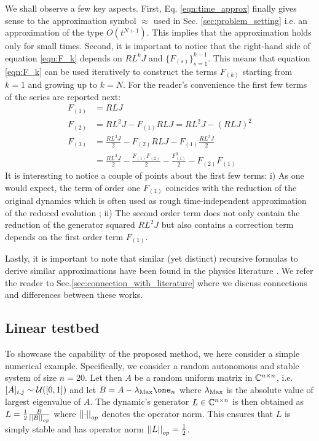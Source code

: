 \documentclass[10pt,aps,pra,twocolumn,showpacs,superscriptaddress,nobalancelastpage,notitlepage,nofootinbib,longbibliography]{revtex4-2}
\begin{document}
We shall observe a few key aspects. 
First, Eq. \eqref{eqn:time_approx} finally gives sense to the approximation symbol $\approx$ used in Sec. \ref{sec:problem_setting} i.e. an approximation of the type $O(t^{N+1})$. This implies that the approximation holds only for small times. 
Second, it is important to notice that the right-hand side of equation \eqref{eqn:F_k} depends on $RL^{k}J$ and $\{F_{(s)}\}_{s=1}^{k-1}$. This means that equation \eqref{eqn:F_k} can be used iteratively to construct the terms $F_{(k)}$ starting from $k=1$ and growing up to $k=N$. 
For the reader's convenience the first few terms of the series are reported next:
\begin{align*}
    F_{(1)} &= RLJ\\
    F_{(2)} &= RL^2J - F_{(1)}RLJ = RL^2J - (RLJ)^2\\
    F_{(3)} &= \frac{RL^3J}{2} - F_{(2)}RLJ - F_{(1)}\frac{RL^2J}{2} \\
    &= \frac{RL^3J}{2} - \frac{F_{(1)}F_{(2)}}{2} - \frac{F_{(1)}^3}{2} - F_{(2)}F_{(1)}
\end{align*}
It is interesting to notice a couple of points about the first few terms: i) As one would expect, the term of order one $F_{(1)}$ coincides with the reduction of the original dynamics which is often used as rough time-independent approximation of the reduced evolution \cite{antoulas}; ii) The second order term does not only contain the reduction of the generator squared $RL^2J$ but also contains a correction term depends on the first order term $F_{(1)}$.  


Lastly, it is important to note that similar (yet distinct) recursive formulas to derive similar approximations have been found in the physics literature \cite{nestmann2019time,cerrillo2014non,cygorek2025timenonlocalversustimelocallongtime,gasbarri2018recursive}.  We refer the reader to Sec.\ref{sec:connection_with_literature} where we discuss connections and differences between these works.

\subsection{Linear testbed}
\label{sec:linear_testbed}

To showcase the capability of the proposed method, we here consider a simple numerical example.  
Specifically, we consider a random autonomous and stable system of size $n=20$. 
Let then $A$ be a random uniform matrix in $\mathbb{C}^{n\times n}$, i.e. $[A]_{i,j}\sim\mathcal{U}([0,1])$ and let $B = A - \lambda_{\rm Max} \one_{n}$ where $\lambda_{\rm Max}$ is the absolute value of largest eigenvalue of $A$. 
The dynamic's generator $L\in\mathbb{C}^{n\times n}$ is then obtained as $L = \frac{1}{2}\frac{B}{\left|\left| B \right|\right|_{op}}$ where $\left|\left| \cdot \right|\right|_{op}$ denotes the operator norm.
This ensures that $L$ is simply stable and has operator norm $\left|\left| L \right|\right|_{op}=\frac{1}{2}$. 
\end{document}
